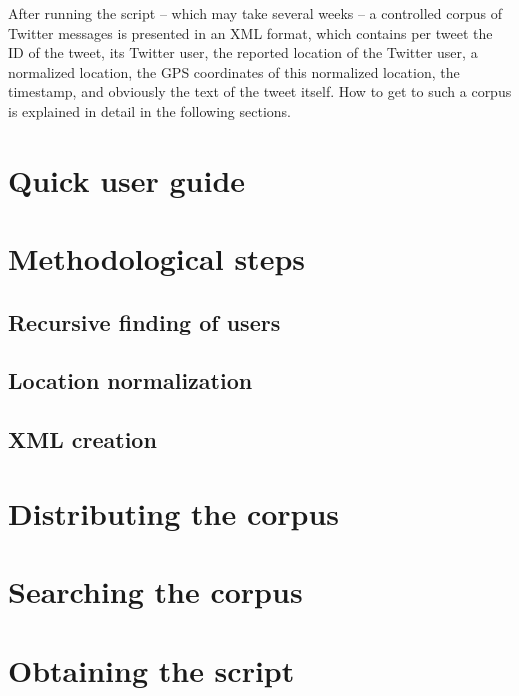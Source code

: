 \documentclass[a4paper,10pt]{article}
\begin{document}
After running the script -- which may take several weeks -- a controlled corpus of Twitter messages is presented in an XML format, which contains per tweet the ID of the tweet, its Twitter user, the reported location of the Twitter user, a normalized location, the GPS coordinates of this normalized location, the timestamp, and obviously the text of the tweet itself. How to get to such a corpus is explained in detail in the following sections.

\section{Quick user guide}

\section{Methodological steps}

\subsection{Recursive finding of users}

\subsection{Location normalization}

\subsection{XML creation}

\section{Distributing the corpus}

\section{Searching the corpus}

\section{Obtaining the script}

\end{document}
